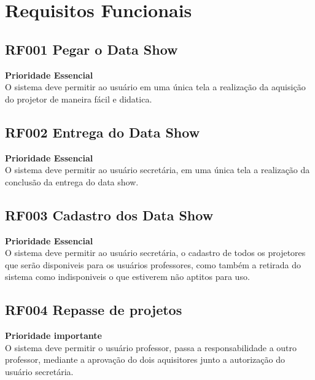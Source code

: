 \section{Requisitos Funcionais}
\hspace{2.0cm}

\subsection{\textbf{RF001 Pegar o Data Show}}

    \textbf{Prioridade Essencial}  \\

    O sistema deve permitir ao usuário em uma única tela a realização da
    aquisição do projetor de maneira fácil e didatica.

\subsection{\textbf{RF002 Entrega do Data Show}}

    \textbf{Prioridade Essencial} \\

    O sistema deve permitir ao usuário secretária, em uma única tela a realização
    da conclusão da entrega do data show. 

\subsection{\textbf{RF003 Cadastro dos Data Show}}

    \textbf{Prioridade Essencial}\\

    O sistema deve permitir ao usuário secretária, o cadastro de todos os
    projetores que serão disponiveis para os usuários professores, como também a
    retirada do sistema como indisponiveis o que estiverem não aptitos para uso.


\subsection{\textbf{RF004 Repasse de projetos}}

    \textbf{Prioridade importante} \\
    
    O sistema deve permitir o usuário professor, passa a responsabilidade a
    outro professor, mediante a aprovação do dois aquisitores junto a
    autorização do usuário secretária. 


